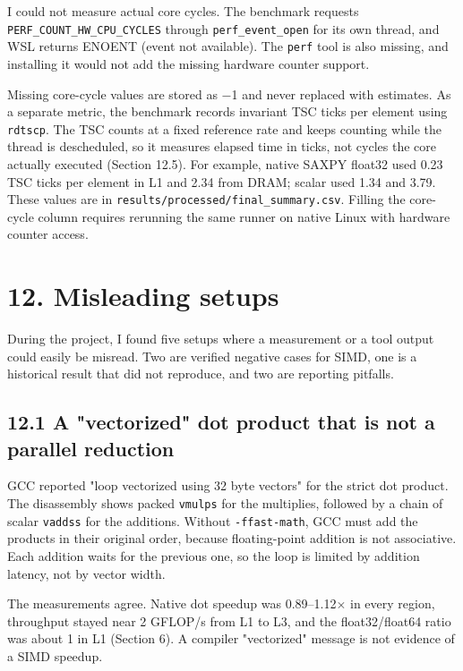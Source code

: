 \documentclass[10pt,letterpaper]{article}
\begin{document}
I could not measure actual core cycles. The benchmark requests \texttt{PERF\_COUNT\_HW\_CPU\_CYCLES} through \texttt{perf\_event\_open} for its own thread, and WSL returns ENOENT (event not available). The \texttt{perf} tool is also missing, and installing it would not add the missing hardware counter support.


Missing core-cycle values are stored as $-$1 and never replaced with estimates. As a separate metric, the benchmark records invariant TSC ticks per element using \texttt{rdtscp}. The TSC counts at a fixed reference rate and keeps counting while the thread is descheduled, so it measures elapsed time in ticks, not cycles the core actually executed (Section 12.5). For example, native SAXPY float32 used 0.23 TSC ticks per element in L1 and 2.34 from DRAM; scalar used 1.34 and 3.79. These values are in \texttt{results/processed/final\_summary.csv}. Filling the core-cycle column requires rerunning the same runner on native Linux with hardware counter access.


\section*{12. Misleading setups}

During the project, I found five setups where a measurement or a tool output could easily be misread. Two are verified negative cases for SIMD, one is a historical result that did not reproduce, and two are reporting pitfalls.


\subsection*{12.1 A "vectorized" dot product that is not a parallel reduction}

GCC reported "loop vectorized using 32 byte vectors" for the strict dot product. The disassembly shows packed \texttt{vmulps} for the multiplies, followed by a chain of scalar \texttt{vaddss} for the additions. Without \texttt{-ffast-math}, GCC must add the products in their original order, because floating-point addition is not associative. Each addition waits for the previous one, so the loop is limited by addition latency, not by vector width.


The measurements agree. Native dot speedup was 0.89--1.12$\times$ in every region, throughput stayed near 2 GFLOP/s from L1 to L3, and the float32/float64 ratio was about 1 in L1 (Section 6). A compiler "vectorized" message is not evidence of a SIMD speedup.
\end{document}
